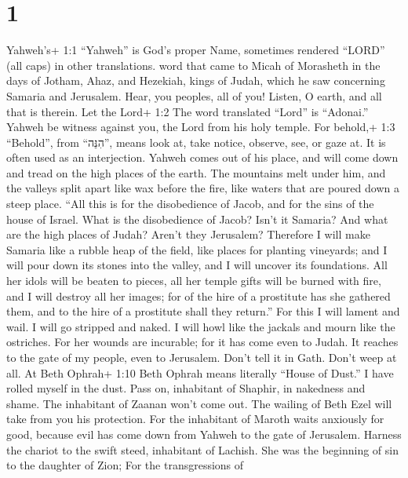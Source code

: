 \hypertarget{section}{%
\section{1}\label{section}}

 Yahweh's+ 1:1 ``Yahweh'' is God's proper Name, sometimes
rendered ``LORD'' (all caps) in other translations. word that came to
Micah of Morasheth in the days of Jotham, Ahaz, and Hezekiah, kings of
Judah, which he saw concerning Samaria and Jerusalem.  Hear,
you peoples, all of you! Listen, O earth, and all that is therein. Let
the Lord+ 1:2 The word translated ``Lord'' is ``Adonai.'' Yahweh be
witness against you, the Lord from his holy temple.  For
behold,+ 1:3 ``Behold'', from ``הִנֵּה'', means look at, take notice,
observe, see, or gaze at. It is often used as an interjection. Yahweh
comes out of his place, and will come down and tread on the high places
of the earth.  The mountains melt under him, and the valleys
split apart like wax before the fire, like waters that are poured down a
steep place.  ``All this is for the disobedience of Jacob,
and for the sins of the house of Israel. What is the disobedience of
Jacob? Isn't it Samaria? And what are the high places of Judah? Aren't
they Jerusalem?  Therefore I will make Samaria like a rubble
heap of the field, like places for planting vineyards; and I will pour
down its stones into the valley, and I will uncover its foundations.
 All her idols will be beaten to pieces, all her temple
gifts will be burned with fire, and I will destroy all her images; for
of the hire of a prostitute has she gathered them, and to the hire of a
prostitute shall they return.''  For this I will lament and
wail. I will go stripped and naked. I will howl like the jackals and
mourn like the ostriches.  For her wounds are incurable; for
it has come even to Judah. It reaches to the gate of my people, even to
Jerusalem.  Don't tell it in Gath. Don't weep at all. At
Beth Ophrah+ 1:10 Beth Ophrah means literally ``House of Dust.'' I have
rolled myself in the dust.  Pass on, inhabitant of Shaphir,
in nakedness and shame. The inhabitant of Zaanan won't come out. The
wailing of Beth Ezel will take from you his protection. 
For the inhabitant of Maroth waits anxiously for good, because evil has
come down from Yahweh to the gate of Jerusalem.  Harness
the chariot to the swift steed, inhabitant of Lachish. She was the
beginning of sin to the daughter of Zion; For the transgressions of
